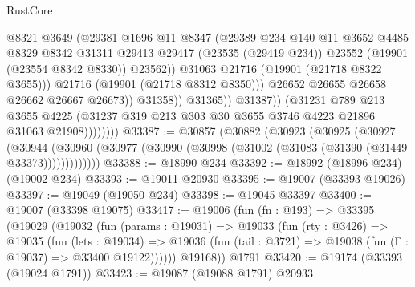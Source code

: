 \begin{lexlean}{RustCore}
\begin{coremodule}
                                    @8321
                                    @3649
                                    (@29381
                                      @1696
                                      @11
                                      @8347
                                      (@29389
                                        @234
                                        @140
                                        @11
                                        @3652
                                        @4485
                                        @8329
                                        @8342
                                        @31311
                                        @29413
                                        @29417
                                        (@23535 (@29419 @234))
                                        @23552
                                        (@19901 (@23554 @8342 @8330))
                                        @23562))
                                    @31063
                                    @21716
                                    (@19901 (@21718 @8322 @3655)))
                                  @21716
                                  (@19901 (@21718 @8312 @8350)))
                                @26652
                                @26655
                                @26658
                                @26662
                                @26667
                                @26673))
                            @31358))
                        @31365))
                    @31387))
                (@31231
                  @789
                  @213
                  @3655
                  @4225
                  (@31237 @319 @213 @303 @30 @3655 @3746 @4223 @21896 @31063 @21908))))))))
@33387 := @30857
    (@30882
      (@30923
        (@30925
          (@30927
            (@30944
              (@30960 (@30977 (@30990 (@30998 (@31002 (@31083 (@31390 (@31449 @33373)))))))))))))
@33388 := @18990 @234
@33392 := @18992 (@18996 @234) (@19002 @234)
@33393 := @19011 @20930
@33395 := @19007 (@33393 @19026)
@33397 := @19049 (@19050 @234)
@33398 := @19045 @33397
@33400 := @19007 (@33398 @19075)
@33417 := @19006
    (fun (fn : @193) =>
    @33395
      (@19029
        (@19032
          (fun (params : @19031) =>
          @19033
            (fun (rty : @3426) =>
            @19035
              (fun (lets : @19034) =>
              @19036 (fun (tail : @3721) => @19038 (fun (Γ : @19037) => @33400 @19122))))))
        @19168))
    @1791
@33420 := @19174 (@33393 (@19024 @1791))
@33423 := @19087 (@19088 @1791) @20933

\end{coremodule}
\end{lexlean}
